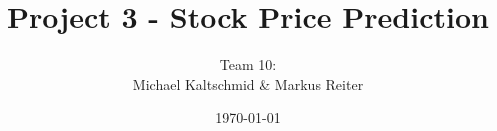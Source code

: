 \documentclass[a4paper]{DPSbachelor}
\title{Project 3 - Stock Price Prediction}
\author{Team 10: \\ Michael Kaltschmid \& Markus Reiter}
\date{\today}
\begin{document}
  \maketitle

	\abstract{}

  \tableofcontents
  \listoffigures
  \listoftables

  
  
  
  
  


  
\end{document}
